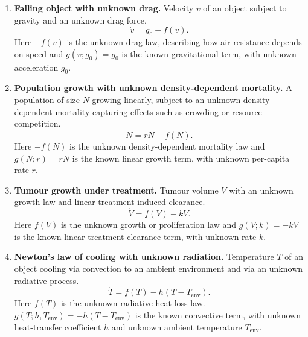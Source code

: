 \documentclass{article}
\theoremstyle{plain}
\theoremstyle{definition}
\begin{document}
{\begin{enumerate}
    
    \item \textbf{Falling object with unknown drag.} Velocity $v$ of an object subject to gravity and an unknown drag force.
    \begin{equation*}
        \dot{v} = g_0 - f(v).
    \end{equation*}
    Here $-f(v)$ is the unknown drag law, describing how air resistance depends on speed and $g(v;g_0) = g_0$ is the known gravitational term, with unknown acceleration $g_0$.

    \item \textbf{Population growth with unknown density-dependent mortality.} A population of size $N$ growing linearly, subject to an unknown density-dependent mortality capturing effects such as crowding or resource competition.
    \begin{equation*}
        \dot{N} = rN - f(N).
    \end{equation*}
    Here $-f(N)$ is the unknown density-dependent mortality law and $g(N;r) = rN$ is the known linear growth term, with unknown per-capita rate $r$.

    \item \textbf{Tumour growth under treatment.} Tumour volume $V$ with an unknown growth law and linear treatment-induced clearance.
    \begin{equation*}
        \dot{V} = f(V) - kV.
    \end{equation*}
    Here $f(V)$ is the unknown growth or proliferation law and $g(V;k) = -kV$ is the known linear treatment-clearance term, with unknown rate $k$.

    \item \textbf{Newton's law of cooling with unknown radiation.} Temperature $T$ of an object cooling via convection to an ambient environment and via an unknown radiative process.
    \begin{equation*}
        \dot{T} = f(T) - h(T - T_{\mathrm{env}}).
    \end{equation*}
    Here $f(T)$ is the unknown radiative heat-loss law. $g(T;h,T_{\mathrm{env}}) = -h(T - T_{\mathrm{env}})$ is the known convective term, with unknown heat-transfer coefficient $h$ and unknown ambient temperature $T_{\mathrm{env}}$.
    
\end{enumerate}


}
\end{document}

